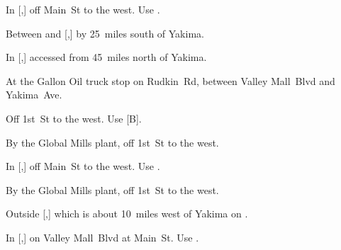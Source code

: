 
\begin{LocationList}

In [,] off Main~St to the west.
Use  .

Between  and [,] by  25~miles south of Yakima.

In [,] accessed from  45~miles north of Yakima.

At the Gallon Oil truck stop on Rudkin~Rd, between Valley Mall~Blvd and Yakima~Ave.

Off 1st~St to the west.
Use  [B].

By the Global Mills plant, off 1st~St to the west.

In [,] off Main~St to the west.
Use  .

\Location{\RecruitmentAgency \Recruitment}
By the Global Mills plant, off 1st~St to the west.

Outside [,] which is about 10~miles west of Yakima on .

In [,] on Valley Mall~Blvd at Main~St.
Use  .

\end{LocationList}
